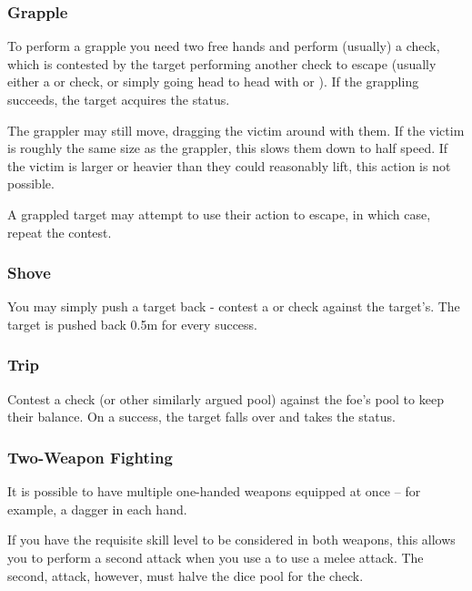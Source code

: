 \subsubsection{Grapple}

To perform a grapple you need two free hands and perform (usually) a  check, which is contested by the target performing another check to escape (usually either a  or  check, or simply going head to head with  or ). If the grappling succeeds, the target acquires the  status. 

The grappler may still move, dragging the victim around with them. If the victim is roughly the same size as the grappler, this slows them down to half speed. If the victim is larger or heavier than they could reasonably lift, this action is not possible. 

A grappled target may attempt to use their action to escape, in which case, repeat the contest. 


\subsubsection{Shove}

You may simply push a target back - contest a  or  check against the target's. The target is pushed back 0.5m for every success. 

\subsubsection{Trip}

Contest a  check (or other similarly argued pool) against the foe's  pool to keep their balance. On a success, the target falls over and takes the  status. 

\subsubsection{Two-Weapon Fighting}

It is possible to have multiple one-handed weapons equipped at once -- for example, a dagger in each hand. 

If you have the requisite skill level to be considered  in both weapons, this allows you to perform a second attack when you use a  to use a melee attack. The second, attack, however, must halve the dice pool for the check.


